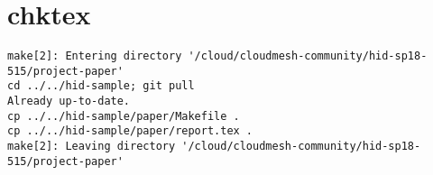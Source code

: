 \appendix
\section{chktex}
\begin{tiny}
\begin{verbatim}
make[2]: Entering directory '/cloud/cloudmesh-community/hid-sp18-515/project-paper'
cd ../../hid-sample; git pull
Already up-to-date.
cp ../../hid-sample/paper/Makefile .
cp ../../hid-sample/paper/report.tex .
make[2]: Leaving directory '/cloud/cloudmesh-community/hid-sp18-515/project-paper'
\end{verbatim}
\end{tiny}
